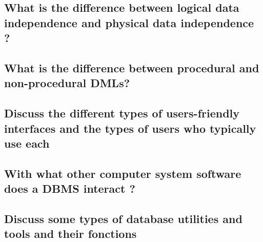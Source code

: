 \subsection{What is the difference between logical data independence and physical data independence ?}

\subsection{What is the difference between procedural and non-procedural DMLs?}

\subsection{Discuss the different types of users-friendly interfaces and the types of users who typically use each}

\subsection{With what other computer system software does a DBMS interact ?}

\subsection{Discuss some types of database utilities and tools and their fonctions}